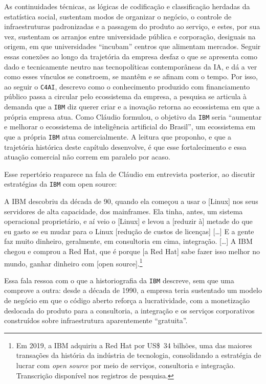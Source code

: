 As continuidades técnicas, as lógicas de codificação e classificação herdadas da estatística social, sustentam modos de organizar o negócio, o controle de infraestruturas padronizadas e a passagem do produto ao serviço, e estes, por sua vez, sustentam os arranjos entre universidade pública e corporação, desiguais na origem, em que universidades \enquote{incubam} centros que alimentam mercados. Seguir essas conexões ao longo da trajetória da empresa desfaz o que se apresenta como dado e tecnicamente neutro nas tecnopolíticas contemporâneas da IA, e dá a ver como esses vínculos se constroem, se mantêm e se afinam com o tempo. Por isso, ao seguir o \texttt{C4AI}, descrevo como o conhecimento produzido com financiamento público passa a circular pelo ecossistema da empresa, a pesquisa se articula à demanda que a \texttt{IBM} diz querer criar e a inovação retorna ao ecossistema em que a própria empresa atua. Como Cláudio formulou, o objetivo da \texttt{IBM} seria \enquote{aumentar e melhorar o ecossistema de inteligência artificial do Brasil}, um ecossistema em que a própria \texttt{IBM} atua comercialmente. A leitura que proponho, e que a trajetória histórica deste capítulo desenvolve, é que esse fortalecimento e essa atuação comercial não correm em paralelo por acaso.

Esse repertório reaparece na fala de Cláudio em entrevista posterior, ao discutir estratégias da \texttt{IBM} com open source:

\begin{citacaoabnt}
A IBM descobriu da década de 90, quando ela começou a usar o [Linux] nos seus servidores de alta capacidade, dos mainframes. Ela tinha, antes, um sistema operacional proprietário, e aí veio o [Linux] e levou a [reduzir à] metade do que eu gasto se eu mudar para o Linux [redução de custos de licenças] [\ldots] E a gente faz muito dinheiro, geralmente, em consultoria em cima, integração. [\ldots] A IBM chegou e comprou a Red Hat, que é porque [a Red Hat] sabe fazer isso melhor no mundo, ganhar dinheiro com [open source].\footnote{Em 2019, a IBM adquiriu a Red Hat por US\$~34 bilhões, uma das maiores transações da história da indústria de tecnologia, consolidando a estratégia de lucrar com \textit{open source} por meio de serviços, consultoria e integração. Transcrição disponível nos registros de pesquisa.}
\end{citacaoabnt}

Essa fala ressoa com o que a historiografia da \texttt{IBM} descreve, sem que uma comprove a outra: desde a década de 1990, a empresa teria sustentado um modelo de negócio em que o código aberto reforça a lucratividade, com a monetização deslocada do produto para a consultoria, a integração e os serviços corporativos construídos sobre infraestrutura aparentemente \enquote{gratuita}.

